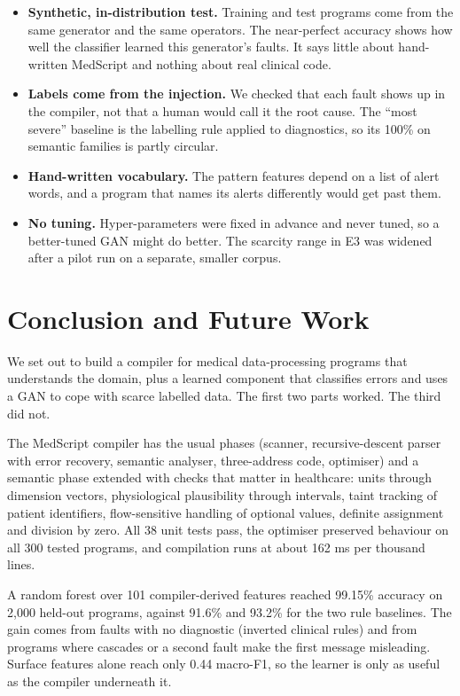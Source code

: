 \documentclass[12pt,a4paper]{article}
\newcommand{\RuleFirstAcc}{91.6}
\newcommand{\RulePrioAcc}{93.2}
\newcommand{\RFAcc}{99.15}
\newcommand{\MsPerKloc}{162}
\begin{document}
\begin{itemize}
    \item \textbf{Synthetic, in-distribution test.} Training and test programs come from the same generator and the same
    operators. The near-perfect accuracy shows how well the classifier learned this generator's faults. It says little
    about hand-written MedScript and nothing about real clinical code.
    \item \textbf{Labels come from the injection.} We checked that each fault shows up in the compiler, not that a human
    would call it the root cause. The ``most severe'' baseline is the labelling rule applied to diagnostics, so its 100\%
    on semantic families is partly circular.
    \item \textbf{Hand-written vocabulary.} The pattern features depend on a list of alert words, and a program that names
    its alerts differently would get past them.
    \item \textbf{No tuning.} Hyper-parameters were fixed in advance and never tuned, so a better-tuned GAN might do better.
    The scarcity range in E3 was widened after a pilot run on a separate, smaller corpus.
\end{itemize}

\section{Conclusion and Future Work}

We set out to build a compiler for medical data-processing programs that understands the domain, plus a learned
component that classifies errors and uses a GAN to cope with scarce labelled data. The first two parts worked. The third
did not.

The MedScript compiler has the usual phases (scanner, recursive-descent parser with error recovery, semantic analyser,
three-address code, optimiser) and a semantic phase extended with checks that matter in healthcare: units through
dimension vectors, physiological plausibility through intervals, taint tracking of patient identifiers, flow-sensitive
handling of optional values, definite assignment and division by zero. All 38 unit tests pass, the optimiser preserved
behaviour on all 300 tested programs, and compilation runs at about \MsPerKloc{} ms per thousand lines.

A random forest over 101 compiler-derived features reached \RFAcc\% accuracy on 2{,}000 held-out programs, against
\RuleFirstAcc\% and \RulePrioAcc\% for the two rule baselines. The gain comes from faults with no diagnostic (inverted
clinical rules) and from programs where cascades or a second fault make the first message misleading. Surface features
alone reach only 0.44 macro-F1, so the learner is only as useful as the compiler underneath it.
\end{document}
